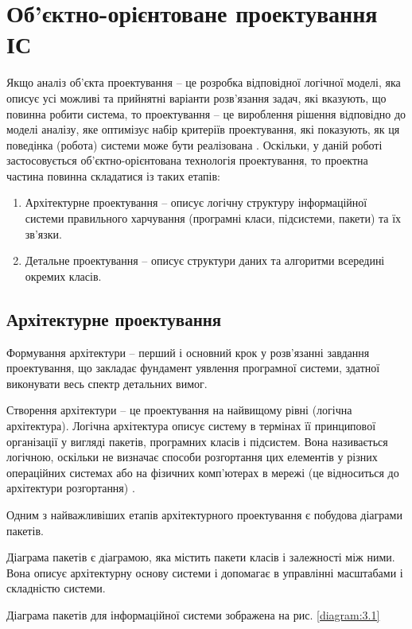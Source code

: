 \documentclass[../main.tex]{subfiles}
\begin{document}
\chapter{Об’єктно-орієнтоване проектування ІС}

Якщо аналіз об’єкта проектування – це розробка відповідної логічної моделі, яка описує усі можливі та прийнятні варіанти розв’язання задач, які вказують, що повинна робити система, то проектування – це вироблення рішення відповідно до моделі аналізу, яке оптимізує набір критеріїв проектування, які  показують, як ця поведінка (робота) системи може бути реалізована \cite{diploma_guidelines}.
Оскільки, у даній роботі застосовується об’єктно-орієнтована технологія проектування, то проектна частина повинна складатися із таких етапів:

\begin{enumerate}
	\item Архітектурне проектування – описує логічну структуру інформаційної системи правильного харчування (програмні класи, підсистеми,  пакети) та їх зв’язки.
	\item Детальне проектування – описує структури даних та алгоритми всередині окремих класів. 
\end{enumerate}

\section{Архітектурне проектування}
Формування архітектури – перший і основний крок у розв’язанні завдання проектування, що закладає фундамент уявлення програмної системи, здатної виконувати весь спектр детальних вимог. \cite{diploma_guidelines2}

Створення архітектури – це проектування на найвищому рівні (логічна архітектура). Логічна архітектура описує систему в термінах її принципової організації у вигляді пакетів, програмних класів і підсистем. Вона називається логічною, оскільки не визначає способи розгортання цих елементів у різних операційних системах або на фізичних комп’ютерах в мережі (це відноситься до архітектури розгортання) \cite{diploma_guidelines}.

Одним з найважливіших етапів архітектурного проектування є побудова діаграми пакетів. 

Діаграма пакетів є діаграмою, яка містить пакети класів і залежності між ними. Вона описує архітектурну основу системи і допомагає в управлінні масштабами і складністю системи.

Діаграма пакетів для інформаційної системи зображена на рис. \ref{diagram:3.1}
\vspace{\baselineskip}
\end{document}
